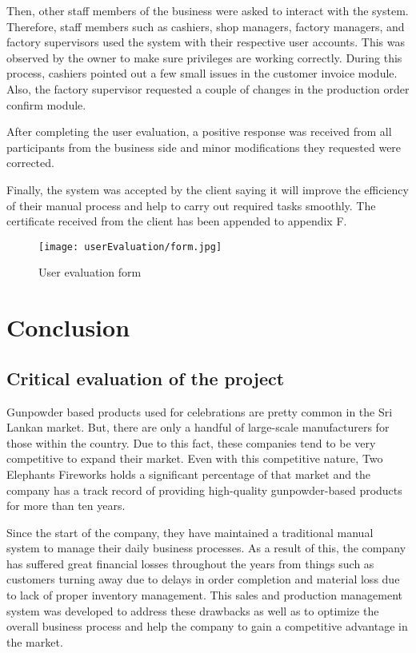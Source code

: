 \documentclass[12pt]{report}
\begin{document}
Then, other staff members of the business were asked to interact with the system. Therefore, staff members such as cashiers, shop managers, factory managers, and factory supervisors used the system with their respective user accounts. This was observed by the owner to make sure privileges are working correctly. During this process, cashiers pointed out a few small issues in the customer invoice module. Also, the factory supervisor requested a couple of changes in the production order confirm module.

After completing the user evaluation, a positive response was received from all participants from the business side and minor modifications they requested were corrected.

Finally, the system was accepted by the client saying it will improve the efficiency of their manual process and help to carry out required tasks smoothly. The certificate received from the client has been appended to appendix F.

\begin{figure}[H]
	\centering
	\texttt{[image: userEvaluation/form.jpg]}
	\caption{User evaluation form}
\end{figure}

\chapter{Conclusion}

\section{Critical evaluation of the project}
Gunpowder based products used for celebrations are pretty common in the Sri Lankan market. But, there are only a handful of large-scale manufacturers for those within the country. Due to this fact, these companies tend to be very competitive to expand their market. Even with this competitive nature, Two Elephants Fireworks holds a significant percentage of that market and the company has a track record of providing high-quality gunpowder-based products for more than ten years.

Since the start of the company, they have maintained a traditional manual system to manage their daily business processes. As a result of this, the company has suffered great financial losses throughout the years from things such as customers turning away due to delays in order completion and material loss due to lack of proper inventory management. This sales and production management system was developed to address these drawbacks as well as to optimize the overall business process and help the company to gain a competitive advantage in the market.
\end{document}
